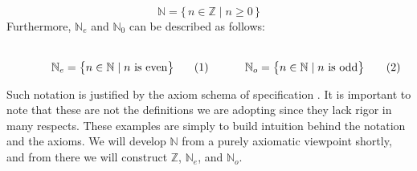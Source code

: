         \begin{equation}
            \mathbb{N}=\{\,n\in\mathbb{Z}\;|\;n\geq{0}\,\}
        \end{equation}
        Furthermore, $\mathbb{N}_{e}$ and $\mathbb{N}_{0}$ can be described as
        follows:
        \par
        \begin{subequations}
            \begin{minipage}[b]{0.495\textwidth}
                \centering
                \begin{equation}
                    \label{eqn:Even_Pos_Ints_Set_Builder}%
                    \mathbb{N}_{e}=
                    \big\{n\in\mathbb{N}\;|\;n\textrm{ is even}\big\}
                \end{equation}
            \end{minipage}
            \hfill
            \begin{minipage}[b]{0.495\textwidth}
                \centering
                \begin{equation}
                    \label{eqn:Odd_Pos_Ints_Set_Builder}%
                    \mathbb{N}_{o}=
                    \big\{n\in\mathbb{N}\;|\;n\textrm{ is odd}\big\}
                \end{equation}
            \end{minipage}
        \end{subequations}
        \par\vspace{2.5ex}
        Such notation is justified by the axiom schema of specification%
        . It is important to note that
        these are not the definitions we are adopting since they lack rigor in
        many respects. These examples are simply to build intuition behind the
        notation and the axioms. We will develop $\mathbb{N}$ from a purely
        axiomatic viewpoint shortly, and from there we will construct
        $\mathbb{Z}$, $\mathbb{N}_{e}$, and $\mathbb{N}_{o}$.
